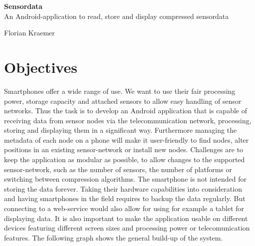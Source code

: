 \documentclass[11pt,oneside,a4paper]{scrartcl}
\begin{document}
\vspace*{1cm}
\pagestyle{fancy}
\fancyhf{}
\fancyhead[LO]{\today}
\renewcommand{\headrulewidth}{0.5pt}
\renewcommand{\footrulewidth}{0.5pt}
\addtolength{\headheight}{30pt}



\vspace*{2cm}
\begin{center}
\vspace*{0.5cm}
\textbf{\Huge Sensordata}
\vspace*{2cm}
\\ An Android-application to read, store and display compressed sensordata\\
\end{center}

\vspace*{3cm}

\begin{center}
\textbf{\LARGE} Florian Kraemer \\
\end{center}

\newpage %

\tableofcontents

\newpage

\setcounter{page}{1}
\pagestyle{fancy}
\fancyhf{}
\renewcommand{\headrulewidth}{0.5pt}
\fancyfoot[C]{\thepage}
\renewcommand{\footrulewidth}{0.5pt}

\onehalfspacing
\setcounter{section}{0}

\section{Objectives}
Smartphones offer a wide range of use. We want to use their fair processing power, storage capacity and attached sensors to allow easy handling of sensor networks. Thus the task is to develop an Android application that is capable of receiving data from sensor nodes via the telecommunication network, processing, storing and displaying them in a significant way. Furthermore managing the metadata of each node on a phone will make it user-friendly to find nodes, alter positions in an existing sensor-network or install new nodes. Challenges are to keep the application as modular as possible, to allow changes to the supported sensor-network, such as the number of sensors, the number of platforms or switching between compression algorithms. The smartphone is not intended for storing the data forever. Taking their hardware capabilities into consideration and having smartphones in the field requires to backup the data regularly. But connecting to a web-service would also allow for using for example a tablet for displaying data. It is also important to make the application usable on different devices featuring different screen sizes and processing power or telecomunication features.
The following graph shows the general build-up of the system.
\end{document}
